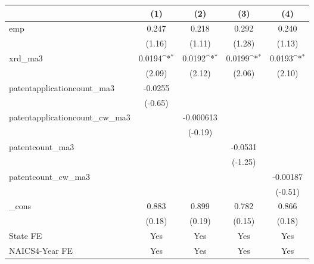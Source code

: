 {
\def\sym#1{\ifmmode^{#1}\else\(^{#1}\)\fi}
\begin{tabular}{l*{4}{c}}
\hline\hline
            &\multicolumn{1}{c}{(1)}         &\multicolumn{1}{c}{(2)}         &\multicolumn{1}{c}{(3)}         &\multicolumn{1}{c}{(4)}         \\
\hline
emp         &       0.247         &       0.218         &       0.292         &       0.240         \\
            &      (1.16)         &      (1.11)         &      (1.28)         &      (1.13)         \\
[1em]
xrd\_ma3     &      0.0194\sym{*}  &      0.0192\sym{*}  &      0.0199\sym{*}  &      0.0193\sym{*}  \\
            &      (2.09)         &      (2.12)         &      (2.06)         &      (2.10)         \\
[1em]
patentapplicationcount\_ma3&     -0.0255         &                     &                     &                     \\
            &     (-0.65)         &                     &                     &                     \\
[1em]
patentapplicationcount\_cw\_ma3&                     &   -0.000613         &                     &                     \\
            &                     &     (-0.19)         &                     &                     \\
[1em]
patentcount\_ma3&                     &                     &     -0.0531         &                     \\
            &                     &                     &     (-1.25)         &                     \\
[1em]
patentcount\_cw\_ma3&                     &                     &                     &    -0.00187         \\
            &                     &                     &                     &     (-0.51)         \\
[1em]
\_cons      &       0.883         &       0.899         &       0.782         &       0.866         \\
            &      (0.18)         &      (0.19)         &      (0.15)         &      (0.18)         \\
[1em]
State FE    &         Yes         &         Yes         &         Yes         &         Yes         \\
[1em]
NAICS4-Year FE&         Yes         &         Yes         &         Yes         &         Yes         \\

\end{tabular}}

